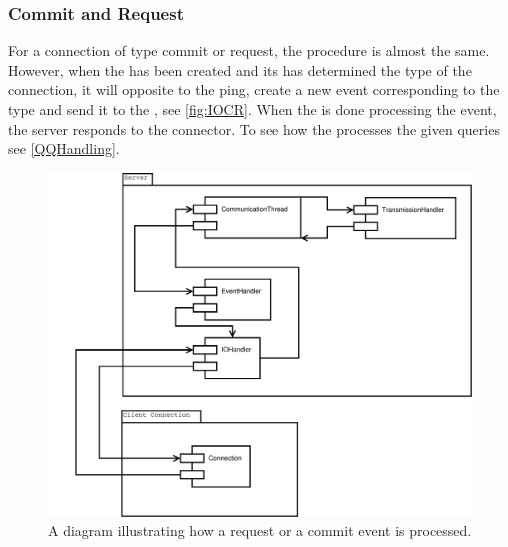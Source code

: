 \subsubsection*{Commit and Request}
For a connection of type commit or request, the procedure is almost the same. However, when the  has been created and its  has determined the type of the connection, it will opposite to the ping, create a new event corresponding to the type and send it to the , see \autoref{fig:IOCR}.
When the  is done processing the event, the server responds to the connector.
To see how the  processes the given queries see \autoref{QQHandling}.

\begin{figure}[htbp]
	\centering
		\includegraphics[scale=0.30]{images/requestCommit}
	\caption{A diagram illustrating how a request or a commit event is processed.}
	\label{fig:IOCR}
\end{figure}